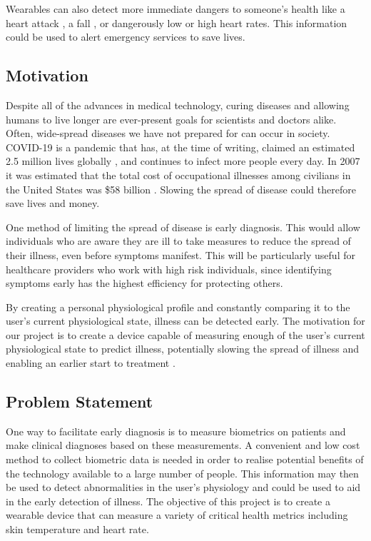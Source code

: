 Wearables can also detect more immediate dangers to someone's health like a
heart attack \cite{heart-attack}, a fall \cite{Khojasteh_2018}, or dangerously
low or high heart rates.  This information could be used to alert emergency
services to save lives.

\subsection{Motivation}

Despite all of the advances in medical technology, curing diseases and
allowing humans to live longer are ever-present goals for scientists and 
doctors alike.  Often, wide-spread diseases we have not prepared for can occur in
society.  COVID-19 is a pandemic that has, at the time of writing, claimed an estimated 2.5 million lives globally
\cite{johns-hopkins-corona-chan}, and continues to infect more people every
day.  In 2007 it was estimated that the total cost of occupational illnesses
among civilians in the United States was \$58 billion \cite{Leigh2011}.
Slowing the spread of disease could therefore save lives and money.

One method of limiting the spread of disease is early diagnosis.  This would
allow individuals who are aware they are ill to take measures to reduce the
spread of their illness, even before symptoms manifest.  This will be
particularly useful for healthcare providers who work with high risk
individuals, since identifying symptoms early has the highest efficiency for
protecting others.

By creating a personal physiological profile and constantly
comparing it to the user's current physiological state, illness can be detected
early.  The motivation for our project is to create a device capable of measuring 
enough of the user's current physiological state to predict illness, potentially slowing the spread of illness and enabling an earlier start to treatment .

\subsection{Problem Statement}

One way to facilitate early diagnosis is to measure biometrics on patients and
make clinical diagnoses based on these measurements.
A convenient and low cost method to collect biometric data is needed in order
to realise potential benefits of the technology available to a large number of
people. This information may then be used to detect abnormalities in the user’s 
physiology and could be used to aid in the early detection of illness.
The objective of this project is to create a wearable device that can measure a
variety of critical health metrics including skin temperature and heart rate.


